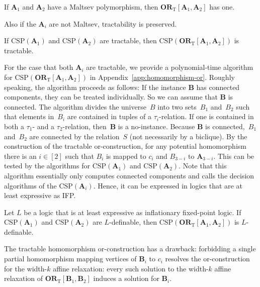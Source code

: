 \documentclass[a4paper,english, thm-restate]{lipics-v2021}
\newcommand{\sig}{\tau}
\newcommand{\StructA}{\mathbf{A}}
\newcommand{\StructB}{\mathbf{B}}
\newcommand{\CSP}[1]{\mathrm{CSP}(#1)}
\newcommand{\ORT}[1]{\mathbf{OR}_\text{T}[#1]}
\begin{document}
	\begin{lemma}[restate = maltsevForOrConstruction, name = ]
		\label{lem:maltsevForOrConstruction}
		If $\StructA_1$ and $\StructA_2$ have a Maltsev polymorphism, then $\ORT{\StructA_1,\StructA_2}$ has one.
	\end{lemma}	
	
	\noindent Also if the $\StructA_i$ are not Maltsev, tractability is preserved.
	\begin{lemma}[restate = homOrTractable, name = ]
		\label{lem:hom-or-tractable}
		If $\CSP{\StructA_1}$ and $\CSP{\StructA_2}$ are tractable, then $\CSP{\ORT{\StructA_1,\StructA_2}}$ is tractable.
	\end{lemma}
	For the case that both $\StructA_i$ are tractable,
	we provide a polynomial-time algorithm for $\CSP{\ORT{\StructA_1,\StructA_2}}$ in Appendix~\ref{app:homomorphism-or}.
	Roughly speaking, the algorithm proceeds as follows:
	If the instance $\StructB$ has connected components, they can be treated individually.
	So we can assume that $\StructB$ is connected.
	The algorithm divides the universe~$B$
	into two sets~$B_1$ and~$B_2$ such that elements in~$B_i$ are contained in tuples of a $\sig_i$-relation. If one is contained in both a $\sig_1$- and a $\sig_2$-relation,
	then~$\StructB$ is a no-instance.
	Because $\StructB$ is connected,~$B_1$ and~$B_2$ are connected by the relation~$S$ (not necessarily by a biclique). By the construction of the tractable or-construction, for any potential homomorphism there is an $i\in[2]$ such that $B_i$ is mapped to $c_i$ and $B_{3-i}$ to $\StructA_{3-i}$.
	This can be tested by the algorithms for $\CSP{\StructA_1}$ and $\CSP{\StructA_2}$.
	Note that this algorithm essentially only computes connected components and calls the decision algorithms of the  $\CSP{\StructA_i}$.
	Hence, it can be expressed in logics that are at least expressive as IFP.
	\begin{corollary}[restate = homOrDefinable, name = ]
		\label{cor:hom-or-definable}
		Let $L$ be a logic that is at least expressive as inflationary fixed-point logic.
		If $\CSP{\StructA_1}$ and $\CSP{\StructA_2}$ are $L$-definable,
		then $\CSP{\ORT{\StructA_1,\StructA_2}}$ is $L$-definable.
	\end{corollary}
	
	\noindent
	The tractable homomorphism or-construction has a drawback:
	forbidding a single partial homomorphism
	mapping vertices of $\StructB_i$ to $c_i$
	resolves the or-construction for the width-$k$ affine relaxation:
	every such solution to the width-$k$ affine relaxation of $\ORT{\StructB_1,\StructB_2}$
	induces a solution for $\StructB_{i}$. 
	
\end{document}
